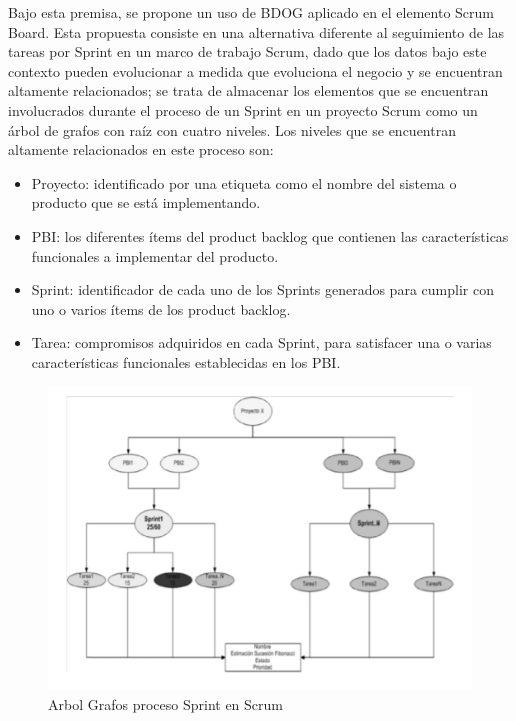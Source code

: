 \documentclass[preprint,12pt]{elsarticle}
\begin{document}
Bajo esta premisa, se propone un uso de BDOG aplicado en el elemento Scrum Board. Esta
propuesta consiste en una alternativa diferente al seguimiento de las tareas por Sprint en un marco de trabajo Scrum, dado que los datos bajo este contexto pueden evolucionar a medida que evoluciona el negocio y se encuentran altamente relacionados; se trata de almacenar los elementos que se encuentran involucrados durante el proceso de un Sprint en un proyecto Scrum como un árbol de grafos con raíz con cuatro niveles. Los niveles que se encuentran altamente relacionados en este proceso son:
\begin{itemize}
\item Proyecto: identificado por una etiqueta como el nombre del sistema o producto que se está implementando.
\item PBI: los diferentes ítems del product backlog que contienen las características funcionales a implementar del producto.
\item Sprint: identificador de cada uno de los Sprints generados para cumplir con uno o varios ítems de los product backlog.
\item Tarea: compromisos adquiridos en cada Sprint, para satisfacer una o varias características funcionales establecidas en los PBI.
\end{itemize}

\begin{figure}[htb]
	\begin{center}
		\includegraphics[width=13cm]{./IMAGENES/basededatos_4} 
		\caption{Arbol Grafos proceso Sprint en Scrum}
	\end{center}
\end{figure}
\end{document}
